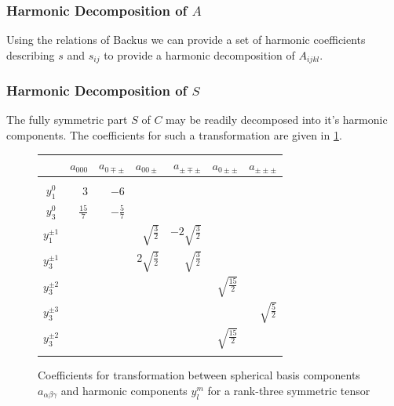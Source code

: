 \documentclass[10pt,a4paper]{article}
\begin{document}
\subsubsection{Harmonic Decomposition of $A$}
Using the relations of Backus we can provide a set of harmonic coefficients describing $s$ and $s_{ij}$ to provide a harmonic decomposition of $A_{ijkl}$.

\subsubsection{Harmonic Decomposition of $S$}
The fully symmetric part $S$ of $C$ may be readily decomposed into it's harmonic components. The coefficients for such a transformation are given in \ref{fig:e-s-coeff}.

\begin{figure}

\begin{tabular}{c|rrrrrr}
 & $a_{000}$ & $a_{0\mp\pm}$ & $a_{00\pm}$ & $a_{\pm\mp\pm}$  & $a_{0\pm\pm}$ & $a_{\pm\pm\pm}$ \\
 \hline \\ 
$y_1^0$  & $3$ & $-6$ \\
$y_3^0$  & $\frac{15}{7}$ & $-\frac{5}{7}$ \\
$y_1^{\pm 1}$  &  & & $\sqrt{\frac{3}{2}}$ & $-2\sqrt{\frac{3}{2}}$\\
$y_3^{\pm 1}$  &  & & $2\sqrt{\frac{3}{2}}$ & $\sqrt{\frac{3}{2}}$\\
$y_3^{\pm 2}$  &  & & & & $\sqrt{\frac{15}{2}}$\\
$y_3^{\pm 3}$  &  & & & & & $\sqrt{\frac{5}{2}}$\\

 $y_3^{\pm 2}$  &  & & & & $\sqrt{\frac{15}{2}}$\\

\label{fig:e-s-coeff}
\end{tabular}

\caption{Coefficients for transformation between spherical basis components $a_{\alpha\beta\gamma}$ and harmonic components $y^m_l$ for a rank-three symmetric tensor}
\end{figure}
\end{document}
